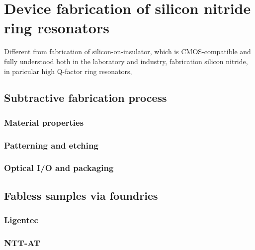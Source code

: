 
\chapter{Device fabrication of silicon nitride ring resonators}

Different from fabrication of silicon-on-insulator, which is CMOS-compatible and fully understood both in the laboratory and industry, fabrication silicon nitride, in paricular high Q-factor ring resonators, 

\section{Subtractive fabrication process}

\subsection{Material properties}
\subsection{Patterning and etching}
\subsection{Optical I/O and packaging}

\section{Fabless samples via foundries}

\subsection{Ligentec}

\subsection{NTT-AT}
